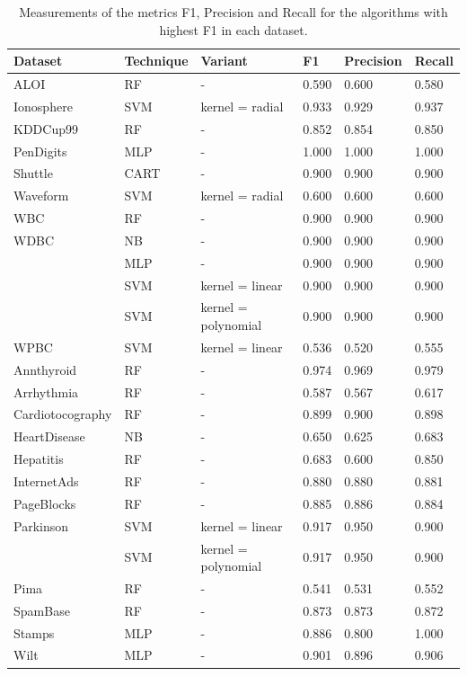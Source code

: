\begin{table}[!ht]
	\centering
	\caption{Measurements of the metrics F1, Precision and Recall for the algorithms with highest F1 in each dataset.}
	\label{tab:best_algs}
\begin{tabular}{@{}llllll@{}}
	\toprule
	\textbf{Dataset} & \textbf{Technique} & \textbf{Variant} & \textbf{F1} & \textbf{Precision} & \textbf{Recall} \\ \midrule
	ALOI & RF & - & 0.590 & 0.600 & 0.580 \\
	Ionosphere & SVM & kernel = radial & 0.933 & 0.929 & 0.937 \\
	KDDCup99 & RF & - & 0.852 & 0.854 & 0.850 \\
	PenDigits & MLP & - & 1.000 & 1.000 & 1.000 \\
	Shuttle & CART & - & 0.900 & 0.900 & 0.900 \\
	Waveform & SVM & kernel = radial & 0.600 & 0.600 & 0.600 \\
	WBC & RF & - & 0.900 & 0.900 & 0.900 \\
	WDBC & NB & - & 0.900 & 0.900 & 0.900 \\
	& MLP & - & 0.900 & 0.900 & 0.900 \\
	& SVM & kernel = linear & 0.900 & 0.900 & 0.900 \\
	& SVM & kernel = polynomial & 0.900 & 0.900 & 0.900 \\
	WPBC & SVM & kernel = linear & 0.536 & 0.520 & 0.555 \\
	Annthyroid & RF & - & 0.974 & 0.969 & 0.979 \\
	Arrhythmia & RF & - & 0.587 & 0.567 & 0.617 \\
	Cardiotocography & RF & - & 0.899 & 0.900 & 0.898 \\
	HeartDisease & NB & - & 0.650 & 0.625 & 0.683 \\
	Hepatitis & RF & - & 0.683 & 0.600 & 0.850 \\
	InternetAds & RF & - & 0.880 & 0.880 & 0.881 \\
	PageBlocks & RF & - & 0.885 & 0.886 & 0.884 \\
	Parkinson & SVM & kernel = linear & 0.917 & 0.950 & 0.900 \\
	& SVM & kernel = polynomial & 0.917 & 0.950 & 0.900 \\
	Pima & RF & - & 0.541 & 0.531 & 0.552 \\
	SpamBase & RF & - & 0.873 & 0.873 & 0.872 \\
	Stamps & MLP & - & 0.886 & 0.800 & 1.000 \\
	Wilt & MLP & - & 0.901 & 0.896 & 0.906 \\ \bottomrule
\end{tabular}
\end{table}

